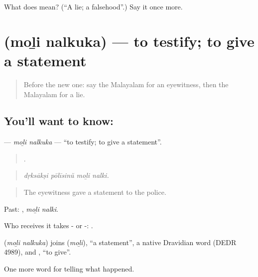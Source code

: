 \begin{tcolorbox}[breakable,colback=teal!4,colframe=teal!35!black,title={Before you move on}]
What does  mean? (\textquotedblleft{}A lie; a falsehood\textquotedblright{}.) Say it once more.
\end{tcolorbox}
\section[\texorpdfstring{\ml{മൊഴി} \ml{നൽകുക} (moḻi nalkuka)}{മൊഴി നൽകുക (moḻi nalkuka)}]{  (moḻi nalkuka) — to testify; to give a statement}

\label{lesson:ML-C370-moli-nalkuka}



\begin{quote}
Before the new one: say the Malayalam for an eyewitness, then the Malayalam for a lie.
\end{quote}

\subsection*{You'll want to know:  }
\textbf{ } — \emph{moḻi nalkuka} — \textquotedblleft{}to testify; to give a statement\textquotedblright{}.

\begin{quote}
   .
\end{quote}

\begin{quote}
\emph{dṛksākṣi pōlīsinŭ moḻi nalki.}
\end{quote}

\begin{quote}
The eyewitness gave a statement to the police.
\end{quote}

Past:  , \emph{moḻi nalki}.

Who receives it takes - or -:   .

\begin{cousinweb}
\textbf{ } (\emph{moḻi nalkuka}) joins  (\emph{moḻi}), \textquotedblleft{}a statement\textquotedblright{}, a native Dravidian word (DEDR 4989), and , \textquotedblleft{}to give\textquotedblright{}.
\end{cousinweb}

\begin{grammarlens}[title={What you've built}]
One more word for telling what happened.
\end{grammarlens}

